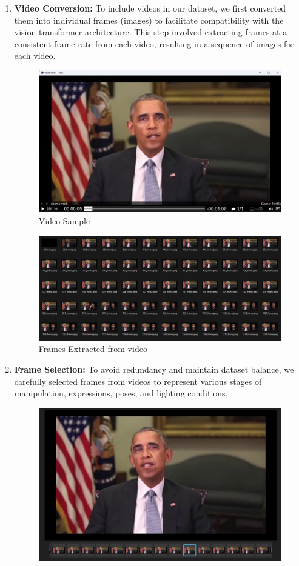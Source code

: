 \begin{enumerate}
    \item \textbf{Video Conversion:} To include videos in our dataset, we first converted them into individual frames (images) to facilitate compatibility with the vision transformer architecture. This step involved extracting frames at a consistent frame rate from each video, resulting in a sequence of images for each video.
          \begin{figure}[h]
              \centering
              \includegraphics[width= 5in ]{img/framesExtracted.jpg}
              \caption{Video Sample}
          \end{figure}
          \begin{figure}[h]
              \centering
              \includegraphics[width= 5in ]{img/frames.jpg}
              \caption{Frames Extracted from video}
          \end{figure}
    \item \textbf{Frame Selection:} To avoid redundancy and maintain dataset balance, we carefully selected frames from videos to represent various stages of manipulation, expressions, poses, and lighting conditions.
          \begin{figure}[h]
              \centering
              \includegraphics[width= 5in ]{img/frameSelected.jpg}

\end{figure}
\end{enumerate}
